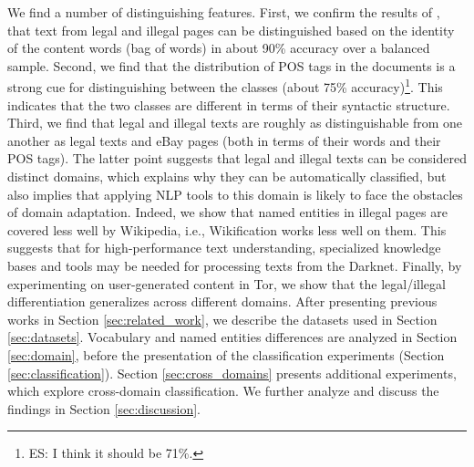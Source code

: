 \documentclass[11pt,a4paper,table]{article}
\newcommand{\es}[1]{\footnote{\color{purple}ES: #1}}
\begin{document}
  We find a number of distinguishing features. First, we confirm the results of \citet{Avarikioti18}, 
	that text from legal and illegal pages can be distinguished based on the identity of the content words (bag of words) 
  in about 90\% accuracy over a balanced sample. Second, we find that the distribution of POS tags in the documents is a strong cue for 
	distinguishing between the classes (about 75\% accuracy)\es{I think it should be 71\%.}. This indicates that the two classes are different in 
	terms of their syntactic structure. Third, we find that legal and illegal texts are roughly as distinguishable from one another as legal 
	texts and eBay pages (both in terms of their words and their POS tags). 
	The latter point suggests that legal and illegal texts can be considered distinct domains, which explains why they can be 
	automatically classified, but also implies that applying NLP tools to this domain is likely to face the obstacles of domain adaptation.  
  Indeed, we show that named entities in illegal pages are covered less well by Wikipedia, i.e., Wikification works less well on them.
  This suggests that for high-performance text understanding, specialized knowledge bases and tools may be needed for processing texts from the Darknet.
  Finally, by experimenting on user-generated content in Tor, we show that the legal/illegal differentiation generalizes across different domains.
  After presenting previous works in Section \ref{sec:related_work}, we describe the datasets used in Section \ref{sec:datasets}. Vocabulary and named entities differences are analyzed in Section \ref{sec:domain}, before the presentation of the classification experiments (Section \ref{sec:classification}). Section \ref{sec:cross_domains} presents additional experiments, which explore cross-domain classification. We further analyze and discuss the findings in Section \ref{sec:discussion}.
  
  
  
	
%   
%   
%   
%
%
%
%
\end{document}
